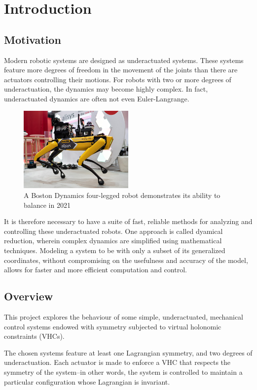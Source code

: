\documentclass[main.tex]{subfiles}
\begin{document}
\chapter{Introduction}
\section{Motivation}
Modern robotic systems are designed as {underactuated} systems. These systems feature more degrees of freedom in the movement of the joints than there are actuators controlling their motions\cite{underactuated}. 
For robots with two or more degrees of underactuation, the dynamics may become highly complex. In fact, underactuated dynamics are often not even Euler-Langrange\cite{mccarthy}.
\begin{figure}[H]
    \centering
    \includegraphics[width=0.5\textwidth]{assets/bostondyn.png}
    \caption{A Boston Dynamics four-legged robot demonstrates its ability to balance in 2021 \cite{bostondyn}}
    \label{fig:bostondyn}
\end{figure}
It is therefore necessary to have a suite of fast, reliable methods for analyzing and controlling these underactuated robots. One approach is called dyamical reduction, wherein complex dynamics are simplified using mathematical techniques. Modeling a system to be with only a subset of its generalized coordinates, without compromising on the usefulness and accuracy of the model, allows for faster and more efficient computation and control.
\section{Overview}
This project explores the behaviour of some simple, underactuated, mechanical control systems endowed with symmetry subjected to virtual holonomic constraints (VHCs). 

The chosen systems feature at least one Lagrangian symmetry, and two degrees of underactuation. Each actuator is made to enforce a VHC that respects the symmetry of the system--in other words, the system is controlled to maintain a particular configuration whose Lagrangian is invariant.
\end{document}
